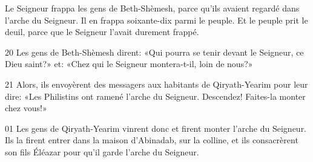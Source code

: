 Le Seigneur frappa les gens de Beth-Shèmesh, parce qu’ils avaient regardé dans l’arche du Seigneur. Il en frappa soixante-dix parmi le peuple. Et le peuple prit le deuil, parce que le Seigneur l’avait durement frappé.

20 Les gens de Beth-Shèmesh dirent: «Qui pourra se tenir devant le Seigneur, ce Dieu saint?» et: «Chez qui le Seigneur montera-t-il, loin de nous?»

21 Alors, ils envoyèrent des messagers aux habitants de Qiryath-Yearim pour leur dire: «Les Philistins ont ramené l’arche du Seigneur. Descendez! Faites-la monter chez vous!»

01 Les gens de Qiryath-Yearim vinrent donc et firent monter l’arche du Seigneur. Ils la firent entrer dans la maison d’Abinadab, sur la colline, et ils consacrèrent son fils Éléazar pour qu’il garde l’arche du Seigneur.

